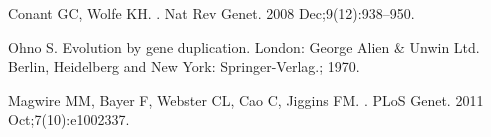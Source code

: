 \documentclass[10pt,letterpaper]{article}
\begin{document}
\begin{thebibliography}{10}

Conant GC, Wolfe KH.
.
\newblock Nat Rev Genet. 2008 Dec;9(12):938--950.

Ohno S.
\newblock Evolution by gene duplication.
\newblock London: George Alien \& Unwin Ltd. Berlin, Heidelberg and New York:
  Springer-Verlag.; 1970.

Magwire MM, Bayer F, Webster CL, Cao C, Jiggins FM.
.
\newblock PLoS Genet. 2011 Oct;7(10):e1002337.

\end{thebibliography}
\end{document}
